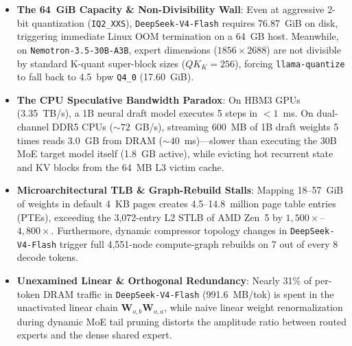 \documentclass[10pt,twocolumn]{article}
\begin{document}
\begin{itemize}
    \item \textbf{The 64~GiB Capacity \& Non-Divisibility Wall}: Even at aggressive 2-bit quantization (\texttt{IQ2\_XXS}), \texttt{DeepSeek-V4-Flash} requires 76.87~GiB on disk, triggering immediate Linux OOM termination on a 64~GB host. Meanwhile, on \texttt{Nemotron-3.5-30B-A3B}, expert dimensions ($1856 \times 2688$) are not divisible by standard K-quant super-block sizes ($QK_K = 256$), forcing \texttt{llama-quantize} to fall back to 4.5~bpw \texttt{Q4\_0} (17.60~GiB).
    \item \textbf{The CPU Speculative Bandwidth Paradox}: On HBM3 GPUs (3.35~TB/s), a 1B neural draft model executes 5 steps in $<1$~ms. On dual-channel DDR5 CPUs ($\sim 72$~GB/s), streaming 600~MB of 1B draft weights 5 times reads 3.0~GB from DRAM ($\sim 40$~ms)---slower than executing the 30B MoE target model itself (1.8~GB active), while evicting hot recurrent state and KV blocks from the 64~MB L3 victim cache.
    \item \textbf{Microarchitectural TLB \& Graph-Rebuild Stalls}: Mapping 18--57~GiB of weights in default 4~KB pages creates 4.5--14.8~million page table entries (PTEs), exceeding the 3,072-entry L2 STLB of AMD Zen~5 by $1,500\times$--$4,800\times$. Furthermore, dynamic compressor topology changes in \texttt{DeepSeek-V4-Flash} trigger full 4,551-node compute-graph rebuilds on 7 out of every 8 decode tokens.
    \item \textbf{Unexamined Linear \& Orthogonal Redundancy}: Nearly 31\% of per-token DRAM traffic in \texttt{DeepSeek-V4-Flash} (991.6~MB/tok) is spent in the unactivated linear chain $\mathbf{W}_{o,b} \mathbf{W}_{o,a}$, while naive linear weight renormalization during dynamic MoE tail pruning distorts the amplitude ratio between routed experts and the dense shared expert.
\end{itemize}
\end{document}
